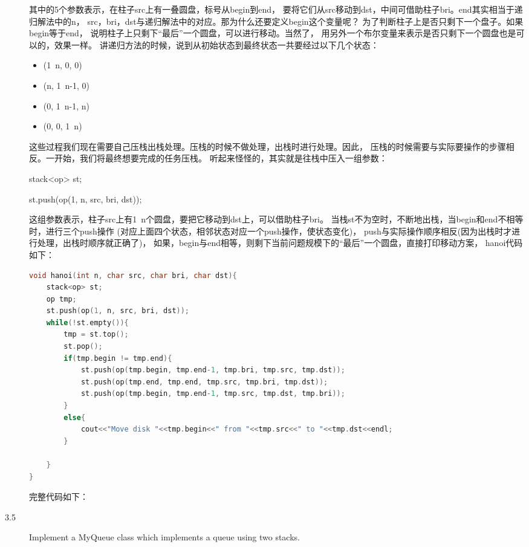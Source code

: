 \begin{description}
其中的5个参数表示，在柱子src上有一叠圆盘，标号从begin到end， 要将它们从src移动到dst，中间可借助柱子bri。end其实相当于递归解法中的n， src，bri，dst与递归解法中的对应。那为什么还要定义begin这个变量呢？ 为了判断柱子上是否只剩下一个盘子。如果begin等于end， 说明柱子上只剩下“最后”一个圆盘，可以进行移动。当然了， 用另外一个布尔变量来表示是否只剩下一个圆盘也是可以的，效果一样。 讲递归方法的时候，说到从初始状态到最终状态一共要经过以下几个状态：
\begin{itemize}
\item (1~n, 0, 0)
\item (n, 1~n-1, 0)
\item (0, 1~n-1, n)
\item (0, 0, 1~n)
\end{itemize}

这些过程我们现在需要自己压栈出栈处理。压栈的时候不做处理，出栈时进行处理。因此， 压栈的时候需要与实际要操作的步骤相反。一开始，我们将最终想要完成的任务压栈。 听起来怪怪的，其实就是往栈中压入一组参数：

stack<op> st;

st.push(op(1, n, src, bri, dst));

这组参数表示，柱子src上有1~n个圆盘，要把它移动到dst上，可以借助柱子bri。 当栈st不为空时，不断地出栈，当begin和end不相等时，进行三个push操作 (对应上面四个状态，相邻状态对应一个push操作，使状态变化)， push与实际操作顺序相反(因为出栈时才进行处理，出栈时顺序就正确了)， 如果，begin与end相等，则剩下当前问题规模下的“最后”一个圆盘，直接打印移动方案， hanoi代码如下：

\begin{lstlisting}[language=C++]
void hanoi(int n, char src, char bri, char dst){
    stack<op> st;
    op tmp;
    st.push(op(1, n, src, bri, dst));
    while(!st.empty()){
        tmp = st.top();
        st.pop();
        if(tmp.begin != tmp.end){
            st.push(op(tmp.begin, tmp.end-1, tmp.bri, tmp.src, tmp.dst));
            st.push(op(tmp.end, tmp.end, tmp.src, tmp.bri, tmp.dst));
            st.push(op(tmp.begin, tmp.end-1, tmp.src, tmp.dst, tmp.bri));
        }
        else{
            cout<<"Move disk "<<tmp.begin<<" from "<<tmp.src<<" to "<<tmp.dst<<endl;
        }

    }
}
\end{lstlisting}

完整代码如下：





\item[3.5] Implement a MyQueue class which implements a queue using two stacks.


\end{description}
